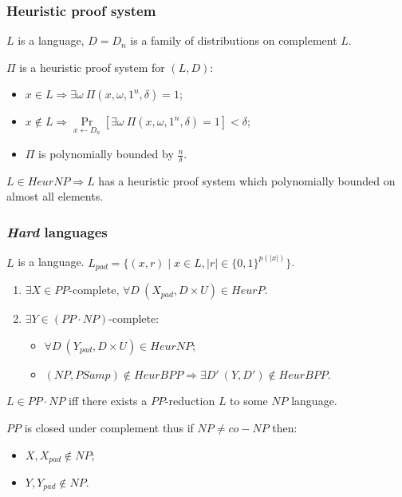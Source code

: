 \begin{frame}
    \frametitle{Heuristic proof system}

    $L$ is a language, $D = {D_n}$ is a family of distributions on
    complement $L$.

    \pause
    \begin{definition}
        $\Pi$ is a heuristic proof system for $(L, D)$:
        \begin{itemize}
            \item $x \in L \Rightarrow \exists \omega~\Pi(x, \omega,
        		1^n, \delta) = 1$;
            \item $x \notin L \Rightarrow
        		\Pr\limits_{x \gets D_n}[\exists \omega~
                \Pi(x, \omega, 1^n, \delta) = 1] < \delta$;
             \item $\Pi$ is polynomially bounded by $\frac{n}{\delta}$.
        \end{itemize}
    \end{definition}

    $L \in HeurNP \Rightarrow L$ has a heuristic proof system which polynomially
    bounded on {\color{blue} almost all} elements.
\end{frame}


\begin{frame}
    \frametitle{\textit{Hard} languages}

    $L$ is a language.
    $L_{pad} = \{(x, r) \mid x \in L, |r| \in \{0, 1 \}^{p(|x|)}\}$.

    \begin{theorem}
        \begin{enumerate}
            \item $\exists X \in PP$-complete, $\forall D~
	    		(X_{pad}, D \times U) \in HeurP$.
    		\pause
    		\item $\exists Y \in (PP \cdot NP)$-complete:
		        \begin{itemize}
        	        \item $\forall D~ (Y_{pad}, D \times U) \in HeurNP$;
                	\item $(NP, PSamp) \notin HeurBPP \Rightarrow \exists D'~ (Y, D')
                		\notin HeurBPP$.
		        \end{itemize}
        		
        \end{enumerate}
    \end{theorem}

    $L \in PP \cdot NP$ iff there exists a $PP$-reduction $L$ to some $NP$ language.
    
    \pause

    \vspace{0.5cm}
    $PP$ is closed under complement thus if $NP \neq co-NP$ then:
    \begin{itemize}
    	\item $X, X_{pad} \notin NP$;
    	\item $Y, Y_{pad} \notin NP$.
    \end{itemize}
 
\end{frame}




